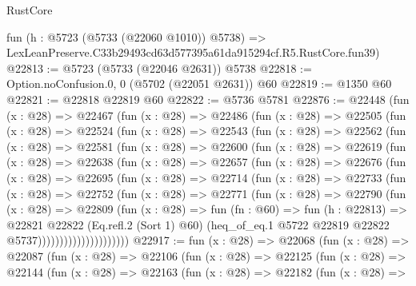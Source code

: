 \begin{lexlean}{RustCore}
\begin{coremodule}
    fun (h : @5723 (@5733 (@22060 @1010)) @5738) =>
    LexLeanPreserve.C33b29493cd63d577395a61da915294cf.R5.RustCore.fun39)
@22813 := @5723 (@5733 (@22046 @2631)) @5738
@22818 := Option.noConfusion.{0, 0} (@5702 (@22051 @2631)) @60
@22819 := @1350 @60
@22821 := @22818 @22819 @60
@22822 := @5736 @5781
@22876 := @22448
    (fun (x : @28) =>
    @22467
      (fun (x : @28) =>
      @22486
        (fun (x : @28) =>
        @22505
          (fun (x : @28) =>
          @22524
            (fun (x : @28) =>
            @22543
              (fun (x : @28) =>
              @22562
                (fun (x : @28) =>
                @22581
                  (fun (x : @28) =>
                  @22600
                    (fun (x : @28) =>
                    @22619
                      (fun (x : @28) =>
                      @22638
                        (fun (x : @28) =>
                        @22657
                          (fun (x : @28) =>
                          @22676
                            (fun (x : @28) =>
                            @22695
                              (fun (x : @28) =>
                              @22714
                                (fun (x : @28) =>
                                @22733
                                  (fun (x : @28) =>
                                  @22752
                                    (fun (x : @28) =>
                                    @22771
                                      (fun (x : @28) =>
                                      @22790
                                        (fun (x : @28) =>
                                        @22809
                                          (fun (x : @28) =>
                                          fun (fn : @60) =>
                                          fun (h : @22813) =>
                                          @22821
                                            @22822
                                            (Eq.refl.{2} (Sort 1) @60)
                                            (heq_of_eq.{1}
                                              @5722
                                              @22819
                                              @22822
                                              @5737)))))))))))))))))))))
@22917 := fun (x : @28) =>
  @22068
    (fun (x : @28) =>
    @22087
      (fun (x : @28) =>
      @22106
        (fun (x : @28) =>
        @22125
          (fun (x : @28) =>
          @22144
            (fun (x : @28) =>
            @22163
              (fun (x : @28) =>
              @22182
                (fun (x : @28) =>

\end{coremodule}
\end{lexlean}
